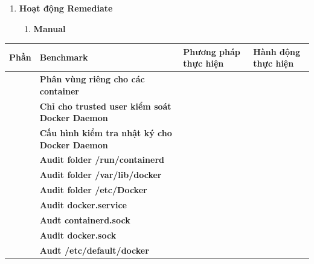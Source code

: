 \begin{enumerate}
\def\labelenumi{\arabic{enumi}.}
\setcounter{enumi}{2}
\item
  \textbf{Hoạt động Remediate}

  \begin{enumerate}
  \def\labelenumii{\arabic{enumii}.}
  \item
    \textbf{Manual}
  \end{enumerate}
\end{enumerate}

{\def\LTcaptype{none} %
\begin{longtable}[]{@{}
  >{\raggedright\arraybackslash}p{}
  >{\raggedright\arraybackslash}p{}
  >{\raggedright\arraybackslash}p{}
  >{\raggedright\arraybackslash}p{}@{}}
\toprule\noalign{}
\begin{minipage}[b]{\linewidth}\raggedright
\textbf{Phần}
\end{minipage} & \begin{minipage}[b]{\linewidth}\raggedright
\textbf{Benchmark}
\end{minipage} & \begin{minipage}[b]{\linewidth}\raggedright
\textbf{Phương pháp thực hiện}
\end{minipage} & \begin{minipage}[b]{\linewidth}\raggedright
\textbf{Hành động thực hiện}
\end{minipage} \\
\midrule\noalign{}
\endhead
\bottomrule\noalign{}
\endlastfoot
\multirow{19}{=}{\textbf{1}} & \textbf{Phân vùng riêng cho các container} & & \\
& \textbf{Chỉ cho trusted user kiểm soát Docker Daemon} & & \\
& \textbf{Cấu hình kiểm tra nhật ký cho Docker Daemon} & & \\
& \textbf{Audit folder /run/containerd} & & \\
& \textbf{Audit folder /var/lib/docker} & & \\
& \textbf{Audit folder /etc/Docker} & & \\
& \textbf{Audit docker.service} & & \\
& \textbf{Audt containerd.sock} & & \\
& \textbf{Audit docker.sock} & & \\
& \textbf{Audt /etc/default/docker} & & \\

\end{longtable}}
